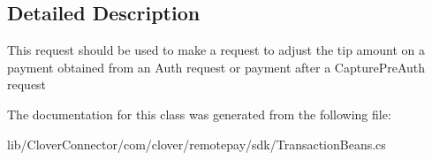 \subsection{Detailed Description}
This request should be used to make a request to adjust the tip amount on a payment obtained from an Auth request or payment after a Capture\+Pre\+Auth request 



The documentation for this class was generated from the following file\+:\begin{DoxyCompactItemize}
\item 
lib/\+Clover\+Connector/com/clover/remotepay/sdk/Transaction\+Beans.\+cs\end{DoxyCompactItemize}
